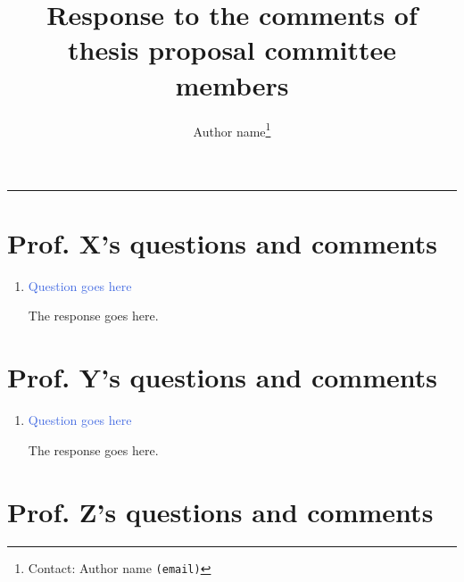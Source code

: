 \documentclass[12pt]{article}
\title{\vspace{-0.75in}\large{Response to the comments of thesis proposal committee members}}
\author[]{Author name\footnote{Contact: Author name \texttt{(email)}}}
\affil[]{Affiliation goes here}
\numberwithin{equation}{section}
\newcommand{\question}{\textcolor{RoyalBlue}}
\begin{document}
\date{}
\maketitle 
\vspace{-0.5cm} \hrule




\section{Prof. X's questions and comments}

\begin{enumerate} [label=\textcolor{RoyalBlue}{\arabic*.},leftmargin= 0.75 cm, itemsep=10pt,parsep=6pt]

\item \question{Question goes here}

The response goes here.



\end{enumerate}






\newpage
\section{Prof. Y's questions and comments}

\begin{enumerate} [label=\textcolor{RoyalBlue}{\arabic*.},leftmargin= 0.75 cm, itemsep=10pt,parsep=6pt]

\item \question{Question goes here}

The response goes here.


\end{enumerate}







\newpage
\section{Prof. Z's questions and comments}
\end{document}
